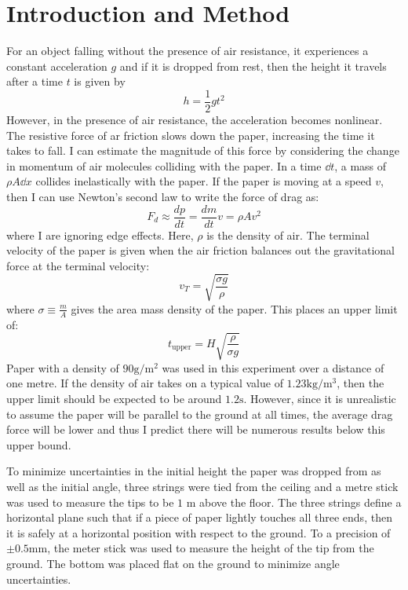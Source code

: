 \documentclass[%
 reprint,
 amsmath,amssymb,
 aps,
]{revtex4-2}
\begin{document}
\section{Introduction and Method}
For an object falling without the presence of air resistance, it experiences a constant acceleration $g$ and if it is dropped from rest, then the height it travels after a time $t$ is given by
\begin{equation}
    h=\frac{1}{2}gt^2
    \label{eq:}
\end{equation}
However, in the presence of air resistance, the acceleration becomes nonlinear. The resistive force of ar friction slows down the paper, increasing the time it takes to fall. I can estimate the magnitude of this force by considering the change in momentum of air molecules colliding with the paper. In a time $\dd{t}$, a mass of $\rho A \dd{x}$ collides inelastically with the paper. If the paper is moving at a speed $v$, then I can use Newton's second law to write the force of drag as:
\begin{equation}
    F_d \approx \frac{dp}{dt}=\frac{dm}{dt}v=\rho Av^2
    \label{eq:drag force}
\end{equation}
where I are ignoring edge effects. Here, $\rho$ is the density of air. The terminal velocity of the paper is given when the air friction balances out the gravitational force at the terminal velocity:
\begin{equation}
    v_T = \sqrt{\frac{\sigma g}{\rho}}
    \label{eq:terminal speed}
\end{equation}
where $\sigma \equiv \frac{m}{A}$ gives the area mass density of the paper. This places an upper limit of:
\begin{equation}
    t_\text{upper} = H\sqrt{\frac{\rho}{\sigma g}}
    \label{eq:}
\end{equation}
Paper with a density of $90 \si{\gram\per\square\meter}$ was used in this experiment over a distance of one metre. If the density of air takes on a typical value of $1.23 \si{\kilo\gram\per\metre\cubed}$\cite{ISA}, then the upper limit should be expected to be around $1.2\si{\second}$. However, since it is unrealistic to assume the paper will be parallel to the ground at all times, the average drag force will be lower and thus I predict there will be numerous results below this upper bound.

To minimize uncertainties in the initial height the paper was dropped from as well as the initial angle, three strings were tied from the ceiling and a metre stick was used to measure the tips to be $1 \text{ m}$ above the floor. The three strings define a horizontal plane such that if a piece of paper lightly touches all three ends, then it is safely at a horizontal position with respect to the ground. To a precision of $\pm 0.5 \si{\milli\meter}$, the meter stick was used to measure the height of the tip from the ground. The bottom was placed flat on the ground to minimize angle uncertainties.
\end{document}
